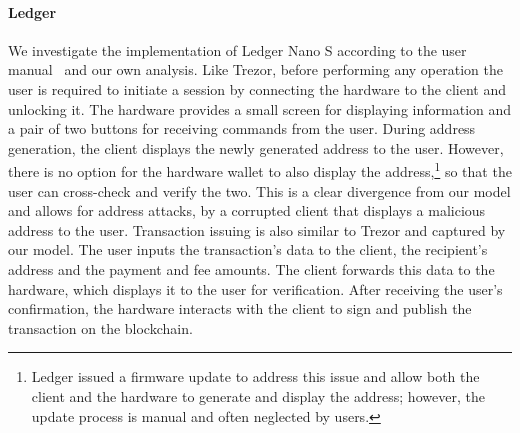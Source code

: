 \paragraph{Ledger}
We investigate the implementation of Ledger Nano S according to the user
manual~\cite{ledger-manual} and our own analysis. Like Trezor, before
performing any operation the user is required to initiate a session by
connecting the hardware to the client and unlocking it. The hardware provides a
small screen for displaying information and a pair of two buttons for receiving
commands from the user.
During address generation, the client displays the newly generated address to
the user. However, there is no option for the hardware wallet to also display
the address,\footnote{Ledger issued a firmware update to address this issue
and allow both the client and the hardware to generate and display the address;
however, the update process is manual and often
neglected by users.} so that the user can cross-check and verify the
two. This is a clear divergence from our model and allows for address attacks,
\eg by a corrupted client that displays a malicious address to the user.
Transaction issuing is also similar to Trezor and captured by our model. The
user inputs the transaction's data to the client, \ie the recipient's address
and the payment and fee amounts. The client forwards this data to the hardware,
which displays it to the user for verification. After receiving the user's
confirmation, the hardware interacts with the client to sign and publish the
transaction on the blockchain.
